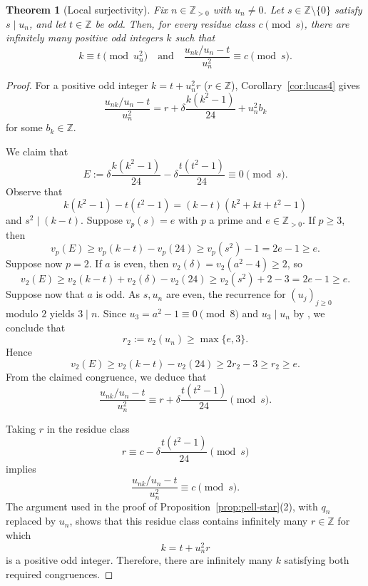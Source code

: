 \documentclass[12pt]{amsart}
\numberwithin{equation}{section}
\newtheorem{theorem}{Theorem}[section]
\theoremstyle{remark}
\theoremstyle{plain}
\newcommand{\Z}{\mathbb{Z}}
\begin{document}
\begin{theorem}[Local surjectivity]\label{thm:lucas-surj}
Fix $n\in\Z_{>0}$ with $u_n\neq0$. Let $s\in\Z\setminus\{0\}$ satisfy $s\mid u_n$, and let $t\in\Z$ be odd. Then, for every residue class $c\pmod{s}$, there are infinitely many positive odd integers $k$ such that
\[
k\equiv t\pmod{u_n^2}\quad\text{and}\quad\frac{u_{nk}/u_n-t}{u_n^2}\equiv c\pmod{s}.
\]
\end{theorem}
\begin{proof}
For a positive odd integer $k=t+u_n^2r$ ($r\in\Z$), Corollary~\ref{cor:lucas4} gives
\[
\frac{u_{nk}/u_n-t}{u_n^2}=r+\delta\frac{k(k^2-1)}{24}+u_n^2b_k
\]
for some $b_k\in\Z$.

We claim that
\[
E:=\delta\frac{k(k^2-1)}{24}-\delta\frac{t(t^2-1)}{24}\equiv0\pmod{s}.
\]
Observe that
\[
k(k^2-1)-t(t^2-1)=(k-t)(k^2+kt+t^2-1)
\]
and $s^2\mid (k-t)$. Suppose $v_p(s)=e$ with $p$ a prime and $e\in\Z_{>0}$. If $p\ge3$, then
\[v_p(E)\geq v_p(k-t)-v_p(24)\geq v_p(s^2)-1=2e-1\geq e.
\]
Suppose now $p=2$. If $a$ is even, then $v_2(\delta)=v_2(a^2-4)\geq2$, so
\[
v_2(E)\geq v_2(k-t)+v_2(\delta)-v_2(24)\geq v_2(s^2)+2-3=2e-1\geq e.
\]
Suppose now that $a$ is odd. As $s,u_n$ are even, the recurrence for $(u_j)_{j\ge0}$ modulo $2$ yields $3\mid n$. Since $u_3=a^2-1\equiv0\pmod{8}$ and $u_3\mid u_n$ by \cite[(2.35)]{BW23}, we conclude that
\[
r_2:=v_2(u_n)\geq\max\{e,3\}.\]
Hence
\[
v_2(E)\geq v_2(k-t)-v_2(24)\geq2r_2-3\geq r_2\geq e.
\]
From the claimed congruence, we deduce that
\[
\frac{u_{nk}/u_n-t}{u_n^2}\equiv r+\delta\frac{t(t^2-1)}{24}\pmod{s}.
\]

Taking $r$ in the residue class
\[
r\equiv c-\delta\frac{t(t^2-1)}{24}\pmod{s}
\]
implies
\[
\frac{u_{nk}/u_n-t}{u_n^2}\equiv c\pmod{s}.
\]
The argument used in the proof of Proposition~\ref{prop:pell-star}\textup{(2)}, with $q_n$ replaced by $u_n$, shows that this residue class contains infinitely many $r\in\Z$ for which
\[
k=t+u_n^2r
\]
is a positive odd integer. Therefore, there are infinitely many $k$ satisfying both required congruences.
\end{proof}
\end{document}
